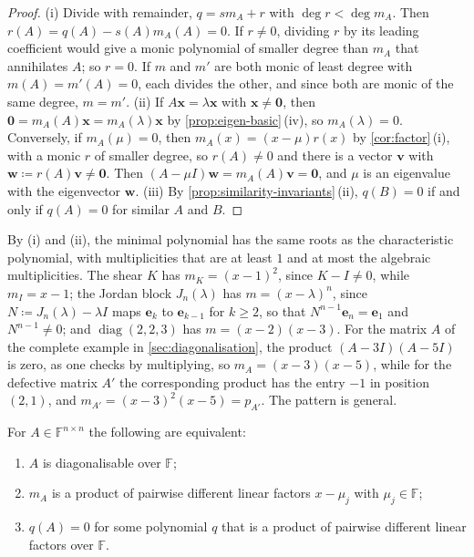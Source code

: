 \begin{proof}
(i) Divide with remainder, $q=sm_A+r$ with $\deg r<\deg m_A$. Then $r(A)=q(A)-s(A)m_A(A)=0$. If $r\ne0$, dividing $r$ by its leading coefficient would give a monic polynomial of smaller degree than $m_A$ that annihilates $A$; so $r=0$. If $m$ and $m'$ are both monic of least degree with $m(A)=m'(A)=0$, each divides the other, and since both are monic of the same degree, $m=m'$. (ii) If $A\mathbf x=\lambda\mathbf x$ with $\mathbf x\ne\mathbf 0$, then $\mathbf 0=m_A(A)\mathbf x=m_A(\lambda)\mathbf x$ by \cref{prop:eigen-basic}\,(iv), so $m_A(\lambda)=0$. Conversely, if $m_A(\mu)=0$, then $m_A(x)=(x-\mu)r(x)$ by \cref{cor:factor}\,(i), with a monic $r$ of smaller degree, so $r(A)\ne0$ and there is a vector $\mathbf v$ with $\mathbf w\coloneqq r(A)\mathbf v\ne\mathbf 0$. Then $(A-\mu I)\mathbf w=m_A(A)\mathbf v=\mathbf 0$, and $\mu$ is an eigenvalue with the eigenvector $\mathbf w$. (iii) By \cref{prop:similarity-invariants}\,(ii), $q(B)=0$ if and only if $q(A)=0$ for similar $A$ and $B$.
\end{proof}

By (i) and (ii), the minimal polynomial has the same roots as the characteristic polynomial, with multiplicities that are at least $1$ and at most the algebraic multiplicities. The shear $K$ has $m_K=(x-1)^2$, since $K-I\ne0$, while $m_I=x-1$; the Jordan block $J_n(\lambda)$ has $m=(x-\lambda)^n$, since $N\coloneqq J_n(\lambda)-\lambda I$ maps $\mathbf e_k$ to $\mathbf e_{k-1}$ for $k\ge2$, so that $N^{n-1}\mathbf e_n=\mathbf e_1$ and $N^{n-1}\ne0$; and $\operatorname{diag}(2,2,3)$ has $m=(x-2)(x-3)$. For the matrix $A$ of the complete example in \cref{sec:diagonalisation}, the product $(A-3I)(A-5I)$ is zero, as one checks by multiplying, so $m_A=(x-3)(x-5)$, while for the defective matrix $A'$ the corresponding product has the entry $-1$ in position $(2,1)$, and $m_{A'}=(x-3)^2(x-5)=p_{A'}$. The pattern is general.

\begin{theorem}
\label{thm:diagonalisable-minimal}
For $A\in\mathbb F^{n\times n}$ the following are equivalent:
\begin{enumerate}
\item $A$ is diagonalisable over $\mathbb F$;
\item $m_A$ is a product of pairwise different linear factors $x-\mu_j$ with $\mu_j\in\mathbb F$;
\item $q(A)=0$ for some polynomial $q$ that is a product of pairwise different linear factors over $\mathbb F$.
\end{enumerate}
\end{theorem}

